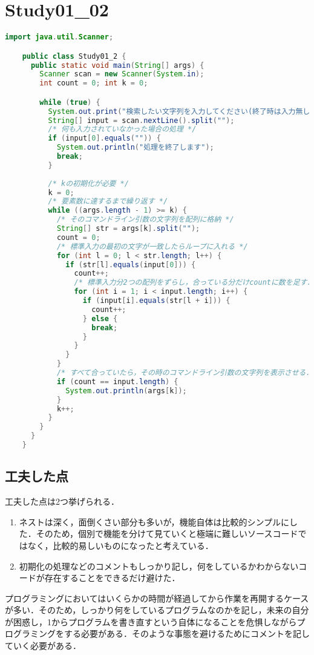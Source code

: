 \documentclass{jlreq}
\begin{document}
  \section*{Study01\_02}
  \begin{lstlisting}[caption=Study01\_2.javaのソースコード, label=code:in, language=java]
    import java.util.Scanner;

    public class Study01_2 {
      public static void main(String[] args) {
        Scanner scan = new Scanner(System.in);
        int count = 0; int k = 0;

        while (true) {
          System.out.print("検索したい文字列を入力してください(終了時は入力無しでEnter): ");
          String[] input = scan.nextLine().split("");
          /* 何も入力されていなかった場合の処理 */
          if (input[0].equals("")) {
            System.out.println("処理を終了します");
            break;
          }
          
          /* kの初期化が必要 */
          k = 0;            
          /* 要素数に達するまで繰り返す */
          while ((args.length - 1) >= k) {
            /* そのコマンドライン引数の文字列を配列に格納 */
            String[] str = args[k].split("");
            count = 0;
            /* 標準入力の最初の文字が一致したらループに入れる */
            for (int l = 0; l < str.length; l++) {
              if (str[l].equals(input[0])) {
                count++;
                /* 標準入力分2つの配列をずらし，合っている分だけcountに数を足す． */
                for (int i = 1; i < input.length; i++) {
                  if (input[i].equals(str[l + i])) {
                    count++;
                  } else {
                    break;
                  }
                }
              }
            }
            /* すべて合っていたら，その時のコマンドライン引数の文字列を表示させる． */
            if (count == input.length) {
              System.out.println(args[k]);
            }
            k++;
          }
        }
      }
    }
  \end{lstlisting}
  \subsection*{工夫した点}

  工夫した点は2つ挙げられる．
  \begin{enumerate}[(1.) ]
    \item ネストは深く，面倒くさい部分も多いが，機能自体は比較的シンプルにした．そのため，個別で機能を分けて見ていくと極端に難しいソースコードではなく，比較的易しいものになったと考えている．
    \item 初期化の処理などのコメントもしっかり記し，何をしているかわからないコードが存在することをできるだけ避けた．
  \end{enumerate}
  プログラミングにおいてはいくらかの時間が経過してから作業を再開するケースが多い．そのため，しっかり何をしているプログラムなのかを記し，未来の自分が困惑し，1からプログラムを書き直すという自体になることを危惧しながらプログラミングをする必要がある．そのような事態を避けるためにコメントを記していく必要がある．
\end{document}
